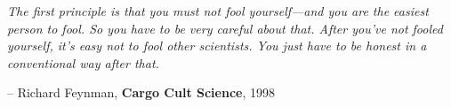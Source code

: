 \documentclass[\main/thesis.tex]{subfiles}
\begin{document}
\begin{quotepage}
 \vspace*{1in}
 \begin{center}
	\emph{The first principle is that you must not fool
          yourself---and you are the easiest person to fool. So you
          have to be very careful about that. After you’ve not fooled
          yourself, it’s easy not to fool other scientists.
          You just have to be honest in a conventional way after that.}
	\begin{flushright}
		-- Richard Feynman, \textbf{Cargo Cult Science}, 1998
	\end{flushright}
 \end{center}
\end{quotepage}
\end{document}
